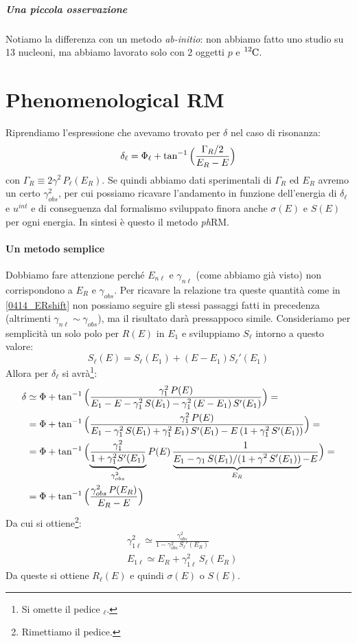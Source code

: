 \subparagraph{Una piccola osservazione} Notiamo la differenza con un metodo \textit{ab-initio}: non abbiamo fatto uno studio su 13 nucleoni, ma abbiamo lavorato solo con 2 oggetti $p$ e $\ce{^{12}C}$.

\newpage

\section{Phenomenological RM}
Riprendiamo l'espressione che avevamo trovato per $\delta$ nel caso di risonanza:
$$\delta_\ell = \Phi_\ell + \tan^{-1} {\Bigl ( \frac{\Gamma_R /2}{E_R-E} \Bigr )}$$
con $\Gamma_R\equiv 2\gamma^2 \, P_\ell(E_R)$. Se quindi abbiamo dati sperimentali di $\Gamma_R$ ed $E_R$ avremo un certo $\gamma^2_{obs}$, per cui possiamo ricavare l'andamento in funzione dell'energia di $\delta_\ell$ e $u^{int}$ e di conseguenza dal formalismo sviluppato finora anche $\sigma(E)$ e $S(E)$ per ogni energia. In sintesi è questo il metodo \textit{ph}RM.

\paragraph{Un metodo semplice} Dobbiamo fare attenzione perché $E_{n\ell}$ e $\gamma_{n\ell}$ (come abbiamo già visto) non corrispondono a $E_R$ e $\gamma_{obs}$. Per ricavare la relazione tra queste quantità come in \eqref{0414_ERshift} non possiamo seguire gli stessi passaggi fatti in precedenza (altrimenti $\gamma_{n\ell} \sim \gamma_{obs}$), ma il risultato darà pressappoco simile. Consideriamo per semplicità un solo polo per $R(E)$ in $E_1$ e sviluppiamo $S_\ell$ intorno a questo valore:
$$S_\ell(E) = S_\ell(E_1) + (E-E_1) S_\ell'(E_1)$$
Allora per $\delta_\ell$ si avrà\footnote{Si omette il pedice $_\ell$.}:
\begin{align*}
	\delta &\simeq \Phi + \tan^{-1}{\Bigl ( \frac{\gamma_1^2 \, P(E)}{E_1 - E - \gamma^2_1 \, S(E_1)-\gamma^2_1 \, (E-E_1) \, S'(E_1)} \Bigr )} = \\
	&= \Phi + \tan^{-1}{\Bigl ( \frac{\gamma_1^2 \, P(E)}{E_1 - \gamma^2_1 \, S(E_1)+\gamma^2_1 \, E_1) \, S'(E_1) - E \, (1+\gamma^2_1 \, S'(E_1))} \Bigr )} = \\
	&= \Phi + \tan^{-1}{\Bigl ( \underbrace{\frac{\gamma_1^2}{1+\gamma^2_1 S'(E_1)}}_{\gamma^2_{obs}} P(E) \, \frac{1}{\underbrace{E_1 - \gamma_1 \, S(E_1)/(1+\gamma^2\, S'(E_1))}_{E_R} - E} \Bigr )} = \\
	&= \Phi + \tan^{-1}{\Bigl ( \frac{\gamma^2_{obs}\, P(E_R)}{E_R - E} \Bigr )}
\end{align*}
Da cui si ottiene\footnote{Rimettiamo il pedice.}:
\begin{align}
	&\gamma_{1\ell}^2 \simeq \frac{\gamma_{obs}^2}{1-\gamma_{obs}^2\, S_{\ell}'(E_R)} \label{0414_gamma1} \\
	&E_{1\ell} \simeq E_R + \gamma^2_{1\ell} \, S_\ell (E_R) \label{0414_E1}
\end{align}
Da queste si ottiene $R_\ell(E)$ e quindi $\sigma(E)$ o $S(E)$.
